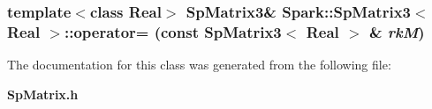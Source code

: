 \subsubsection{\setlength{\rightskip}{0pt plus 5cm}template$<$class Real$>$ {\bf Sp\-Matrix3}\& {\bf Spark::Sp\-Matrix3}$<$ Real $>$::operator= (const {\bf Sp\-Matrix3}$<$ Real $>$ \& {\em rk\-M})}\label{classSpark_1_1SpMatrix3_a9}




The documentation for this class was generated from the following file:\begin{CompactItemize}
\item 
{\bf Sp\-Matrix.h}\end{CompactItemize}
